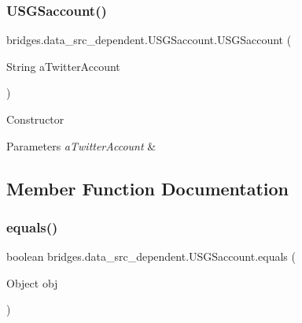 \subsubsection{\texorpdfstring{U\+S\+G\+Saccount()}{USGSaccount()}}
{\footnotesize\ttfamily bridges.\+data\+\_\+src\+\_\+dependent.\+U\+S\+G\+Saccount.\+U\+S\+G\+Saccount (\begin{DoxyParamCaption}\item[{String}]{a\+Twitter\+Account }\end{DoxyParamCaption})}

Constructor 
\begin{DoxyParams}{Parameters}
{\em a\+Twitter\+Account} & \\
\hline
\end{DoxyParams}


\subsection{Member Function Documentation}
\hypertarget{classbridges_1_1data__src__dependent_1_1_u_s_g_saccount_a408a8361407b49199f56ace3421956bf}{}\label{classbridges_1_1data__src__dependent_1_1_u_s_g_saccount_a408a8361407b49199f56ace3421956bf} 
\subsubsection{\texorpdfstring{equals()}{equals()}}
{\footnotesize\ttfamily boolean bridges.\+data\+\_\+src\+\_\+dependent.\+U\+S\+G\+Saccount.\+equals (\begin{DoxyParamCaption}\item[{Object}]{obj }\end{DoxyParamCaption})}

\hypertarget{classbridges_1_1data__src__dependent_1_1_u_s_g_saccount_abc30e69535f158a5f7d6f6d8c8da7bec}{}\label{classbridges_1_1data__src__dependent_1_1_u_s_g_saccount_abc30e69535f158a5f7d6f6d8c8da7bec} 
